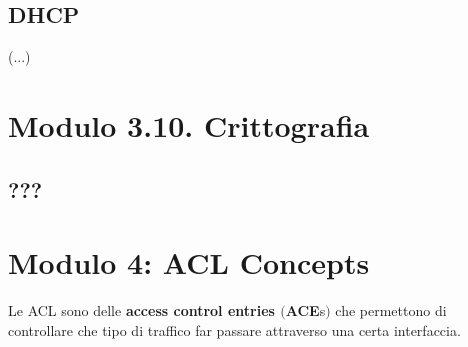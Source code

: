 \documentclass[12pt, a4paper]{article}
\begin{document}
	\subsection*{DHCP}
	(...)
	
	
	
	\section*{Modulo 3.10. Crittografia}
	
	\subsection*{???}
	
	
	\section*{Modulo 4: ACL Concepts}
	
	Le ACL sono delle \textbf{access control entries $($ACE}s$)$ che permettono di controllare che tipo di traffico far passare attraverso una certa interfaccia.
	
	
	
\end{document}
